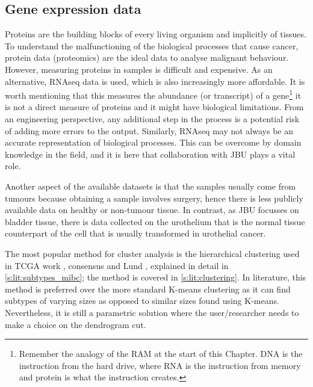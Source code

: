 \subsection{Gene expression data} \label{s:lit:rnaSeq}

\vspace{3mm}
\vspace{3mm}

Proteins are the building blocks of every living organism and implicitly of tissues. To understand the malfunctioning of the biological processes that cause cancer, protein data (proteomics) are the ideal data to analyse malignant behaviour. However, measuring proteins in samples is difficult and expensive. As an alternative, RNAseq data is used, which is also increasingly more affordable. It is worth mentioning that this measures the abundance (or transcript) of a gene\footnote{Remember the analogy of the RAM at the start of this Chapter.  DNA is the instruction from the hard drive, where RNA is the instruction from memory and protein is what the instruction creates.} it is not a direct measure of proteins and it might have biological limitations. From an engineering perspective, any additional step in the process is a potential risk of adding more errors to the output. Similarly, RNAseq may not always be an accurate representation of biological processes. This can be overcome by domain knowledge in the field, and it is here that collaboration with JBU plays a vital role.

Another aspect of the available datasets is that the samples usually come from tumours because obtaining a sample involves surgery, hence there is less publicly available data on healthy or non-tumour tissue. In contrast, as JBU focusses on bladder tissue, there is data collected on the urothelium that is the normal tissue counterpart of the cell that is usually transformed in urothelial cancer.

The most popular method for cluster analysis is the hierarchical clustering used in TCGA work \citep{Robertson2017-mg}, consensus \citep{Kamoun2020-tj} and Lund \citep{Sjodahl2017-xr}, explained in detail in \cref{s:lit:subtypes_mibc}; the method is covered in \cref{s:lit:clustering}. In literature, this method is preferred over the more standard K-means clustering as it can find subtypes of varying sizes as opposed to similar sizes found using K-means. Nevertheless, it is still a parametric solution where the user/researcher needs to make a choice on the dendrogram cut.

